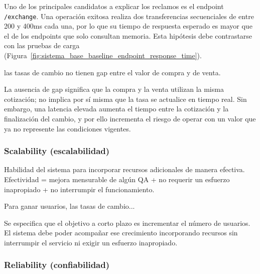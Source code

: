             Uno de los principales candidatos a explicar los reclamos es el endpoint
            \texttt{/exchange}. Una operación exitosa realiza dos transferencias
            secuenciales de entre 200 y 400ms cada una, por lo que su tiempo
            de respuesta esperado es mayor que el de los endpoints que solo consultan
            memoria. Esta hipótesis debe contrastarse con las pruebas de carga (Figura~\ref{fig:sistema_base_baseline_endpoint_response_time}).

            \begin{customenv}[frametitle=]
                las tasas de cambio no tienen gap entre el valor de compra y de venta.
            \end{customenv}

            La ausencia de gap significa que la compra y la venta utilizan la misma
            cotización; no implica por sí misma que la tasa se actualice en tiempo real.
            Sin embargo, una latencia elevada aumenta el tiempo entre la cotización y
            la finalización del cambio, y por ello incrementa el riesgo de operar con
            un valor que ya no represente las condiciones vigentes.

        \subsubsection{Scalability (escalabilidad)}
        \label{sec:escalabilidad}

            Habilidad del sistema para incorporar recursos adicionales de manera efectiva. Efectividad = mejora mensurable de algún QA + no requerir un esfuerzo inapropiado + no interrumpir el funcionamiento.

            \begin{customenv}[frametitle=]
                Para ganar usuarios, las tasas de cambio...
            \end{customenv}

            Se especifica que el objetivo a corto plazo es incrementar el número de
            usuarios. El sistema debe poder acompañar ese crecimiento incorporando
            recursos sin interrumpir el servicio ni exigir un esfuerzo inapropiado.

        \subsubsection{Reliability (confiabilidad)}
        \label{sec:confiabilidad}

